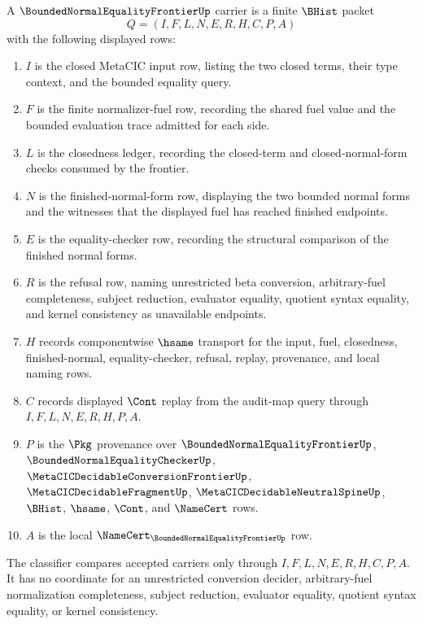 \begin{definition}
\label{def:bounded-normal-equality-frontier-carrier}
A $\BoundedNormalEqualityFrontierUp$ carrier is a finite $\BHist$ packet
$$
Q=(I,F,L,N,E,R,H,C,P,A)
$$
with the following displayed rows:
\begin{enumerate}
\item $I$ is the closed MetaCIC input row, listing the two closed terms, their type context, and the bounded equality query.
\item $F$ is the finite normalizer-fuel row, recording the shared fuel value and the bounded evaluation trace admitted for each side.
\item $L$ is the closedness ledger, recording the closed-term and closed-normal-form checks consumed by the frontier.
\item $N$ is the finished-normal-form row, displaying the two bounded normal forms and the witnesses that the displayed fuel has reached finished endpoints.
\item $E$ is the equality-checker row, recording the structural comparison of the finished normal forms.
\item $R$ is the refusal row, naming unrestricted beta conversion, arbitrary-fuel completeness, subject reduction, evaluator equality, quotient syntax equality, and kernel consistency as unavailable endpoints.
\item $H$ records componentwise $\hsame$ transport for the input, fuel, closedness, finished-normal, equality-checker, refusal, replay, provenance, and local naming rows.
\item $C$ records displayed $\Cont$ replay from the audit-map query through $I,F,L,N,E,R,H,P,A$.
\item $P$ is the $\Pkg$ provenance over $\BoundedNormalEqualityFrontierUp$, $\BoundedNormalEqualityCheckerUp$, $\MetaCICDecidableConversionFrontierUp$, $\MetaCICDecidableFragmentUp$, $\MetaCICDecidableNeutralSpineUp$, $\BHist$, $\hsame$, $\Cont$, and $\NameCert$ rows.
\item $A$ is the local $\NameCert_{\BoundedNormalEqualityFrontierUp}$ row.
\end{enumerate}
The classifier compares accepted carriers only through $I,F,L,N,E,R,H,C,P,A$. It has no coordinate for an unrestricted conversion decider, arbitrary-fuel normalization completeness, subject reduction, evaluator equality, quotient syntax equality, or kernel consistency.
\end{definition}

